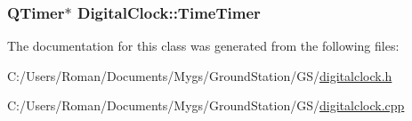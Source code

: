 \subsubsection[{Time\+Timer}]{\setlength{\rightskip}{0pt plus 5cm}Q\+Timer$\ast$ Digital\+Clock\+::\+Time\+Timer}\label{class_digital_clock_aa49ae733b7fb0c8b1f353e9811372d5b}


The documentation for this class was generated from the following files\+:\begin{DoxyCompactItemize}
\item 
C\+:/\+Users/\+Roman/\+Documents/\+Mygs/\+Ground\+Station/\+G\+S/\hyperlink{digitalclock_8h}{digitalclock.\+h}\item 
C\+:/\+Users/\+Roman/\+Documents/\+Mygs/\+Ground\+Station/\+G\+S/\hyperlink{digitalclock_8cpp}{digitalclock.\+cpp}\end{DoxyCompactItemize}
